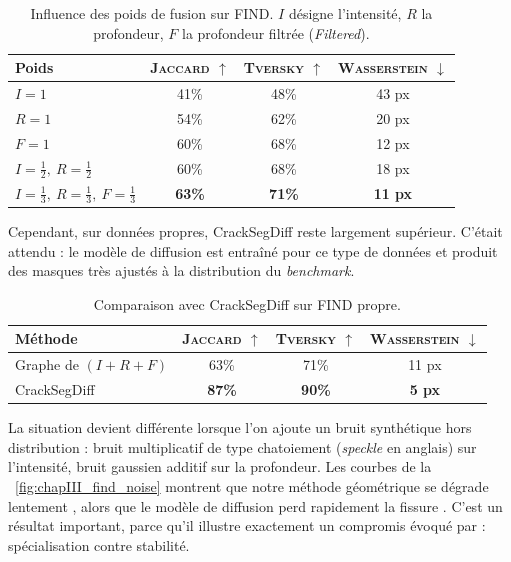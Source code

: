 \begin{table}[H]
    \centering
    \caption{Influence des poids de fusion sur FIND. $I$ désigne l'intensité, $R$ la profondeur, $F$ la profondeur filtrée (\emph{Filtered}).}
    \label{tab:chapIII_find_weights}
    \begin{tabular}{lccc}
        \toprule
        Poids & \textsc{Jaccard} $\uparrow$ & \textsc{Tversky} $\uparrow$ & \textsc{Wasserstein} $\downarrow$ \\
        \midrule
        $I=1$ & 41\% & 48\% & 43 px \\
        $R=1$ & 54\% & 62\% & 20 px \\
        $F=1$ & 60\% & 68\% & 12 px \\
        $I=\frac12,\ R=\frac12$ & 60\% & 68\% & 18 px \\
        $I=\frac13,\ R=\frac13,\ F=\frac13$ & \textbf{63\%} & \textbf{71\%} & \textbf{11 px} \\
        \bottomrule
    \end{tabular}
\end{table}

Cependant, sur données propres, CrackSegDiff \cite{CrackSegDiff2024} reste largement supérieur. C'était attendu : le modèle de diffusion est entraîné pour ce type de données et produit des masques très ajustés à la distribution du \emph{benchmark}.

\begin{table}[H]
    \centering
    \caption{Comparaison avec CrackSegDiff sur FIND propre.}
    \label{tab:chapIII_find_clean}
    \begin{tabular}{lccc}
        \toprule
        Méthode & \textsc{Jaccard} $\uparrow$ & \textsc{Tversky} $\uparrow$ & \textsc{Wasserstein} $\downarrow$ \\
        \midrule
        Graphe de \Frangi{} $(I+R+F)$ & 63\% & 71\% & 11 px \\
        CrackSegDiff & \textbf{87\%} & \textbf{90\%} & \textbf{5 px} \\
        \bottomrule
    \end{tabular}
\end{table}

La situation devient différente lorsque l'on ajoute un bruit synthétique hors distribution : bruit multiplicatif de type chatoiement (\emph{speckle} en anglais) sur l'intensité, bruit gaussien additif sur la profondeur. Les courbes de la \Fig~\ref{fig:chapIII_find_noise} montrent que notre méthode géométrique se dégrade lentement \cite{BibiISPRS}, alors que le modèle de diffusion perd rapidement la fissure \cite{CrackSegDiff2024}. 
C'est un résultat important, parce qu'il illustre exactement un compromis évoqué par \cite{Zhang2025Review} : spécialisation contre stabilité.

